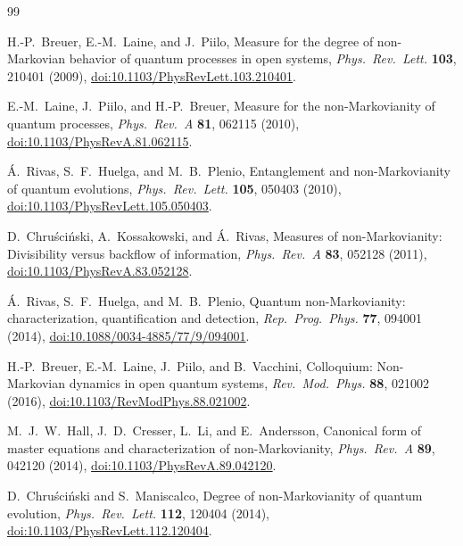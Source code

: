 \documentclass[twocolumn,10pt,amsmath,amssymb,floatfix]{revtex4-2}
\theoremstyle{plain}
\theoremstyle{definition}
\begin{document}
{\raggedright
\begin{thebibliography}{99}

H.-P.~Breuer, E.-M.~Laine, and J.~Piilo,
Measure for the degree of non-Markovian behavior of quantum processes in open systems,
\emph{Phys.\ Rev.\ Lett.} \textbf{103}, 210401 (2009),
\href{https://doi.org/10.1103/PhysRevLett.103.210401}{doi:10.1103/PhysRevLett.103.210401}.

E.-M.~Laine, J.~Piilo, and H.-P.~Breuer,
Measure for the non-Markovianity of quantum processes,
\emph{Phys.\ Rev.\ A} \textbf{81}, 062115 (2010),
\href{https://doi.org/10.1103/PhysRevA.81.062115}{doi:10.1103/PhysRevA.81.062115}.

\'A.~Rivas, S.~F.~Huelga, and M.~B.~Plenio,
Entanglement and non-Markovianity of quantum evolutions,
\emph{Phys.\ Rev.\ Lett.} \textbf{105}, 050403 (2010),
\href{https://doi.org/10.1103/PhysRevLett.105.050403}{doi:10.1103/PhysRevLett.105.050403}.

D.~Chru\'sci\'nski, A.~Kossakowski, and \'A.~Rivas,
Measures of non-Markovianity: Divisibility versus backflow of information,
\emph{Phys.\ Rev.\ A} \textbf{83}, 052128 (2011),
\href{https://doi.org/10.1103/PhysRevA.83.052128}{doi:10.1103/PhysRevA.83.052128}.

\'A.~Rivas, S.~F.~Huelga, and M.~B.~Plenio,
Quantum non-Markovianity: characterization, quantification and detection,
\emph{Rep.\ Prog.\ Phys.} \textbf{77}, 094001 (2014),
\href{https://doi.org/10.1088/0034-4885/77/9/094001}{doi:10.1088/0034-4885/77/9/094001}.

H.-P.~Breuer, E.-M.~Laine, J.~Piilo, and B.~Vacchini,
Colloquium: Non-Markovian dynamics in open quantum systems,
\emph{Rev.\ Mod.\ Phys.} \textbf{88}, 021002 (2016),
\href{https://doi.org/10.1103/RevModPhys.88.021002}{doi:10.1103/RevModPhys.88.021002}.

M.~J.~W.~Hall, J.~D.~Cresser, L.~Li, and E.~Andersson,
Canonical form of master equations and characterization of non-Markovianity,
\emph{Phys.\ Rev.\ A} \textbf{89}, 042120 (2014),
\href{https://doi.org/10.1103/PhysRevA.89.042120}{doi:10.1103/PhysRevA.89.042120}.

D.~Chru\'sci\'nski and S.~Maniscalco,
Degree of non-Markovianity of quantum evolution,
\emph{Phys.\ Rev.\ Lett.} \textbf{112}, 120404 (2014),
\href{https://doi.org/10.1103/PhysRevLett.112.120404}{doi:10.1103/PhysRevLett.112.120404}.


\end{thebibliography}}
\end{document}
